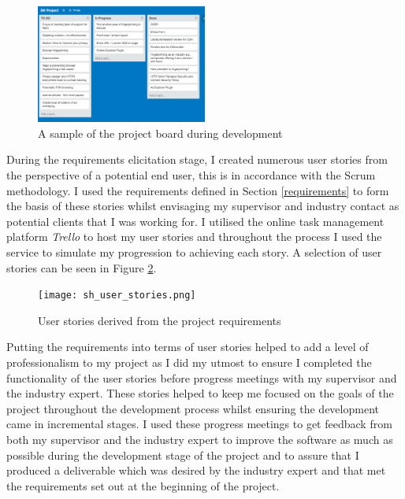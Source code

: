 \documentclass[12pt]{article}
\begin{document}
\begin{figure}[H]
    \centering
    \includegraphics[width=0.5\textwidth]{Project_Board.png}
    \caption{A sample of the project board during development}
    \label{fig:Project_Board}
\end{figure}

During the requirements elicitation stage, I created numerous user stories from the perspective of a potential end user, this is in accordance with the Scrum methodology. I used the requirements defined in Section \ref{requirements} to form the basis of these stories whilst envisaging my supervisor and industry contact as potential clients that I was working for. I utilised the online task management platform \textit{Trello} to host my user stories and throughout the process I used the service to simulate my progression to achieving each story. A selection of user stories can be seen in Figure \ref{fig:sh_user_stories}.

\begin{figure}[H]
    \centering
    \texttt{[image: sh\_user\_stories.png]}
    \caption{User stories derived from the project requirements}
    \label{fig:sh_user_stories}
\end{figure}

Putting the requirements into terms of user stories helped to add a level of professionalism to my project as I did my utmost to ensure I completed the functionality of the user stories before progress meetings with my supervisor and the industry expert. These stories helped to keep me focused on the goals of the project throughout the development process whilst ensuring the development came in incremental stages. I used these progress meetings to get feedback from both my supervisor and the industry expert to improve the software as much as possible during the development stage of the project and to assure that I produced a deliverable which was desired by the industry expert and that met the requirements set out at the beginning of the project. \\
\end{document}
